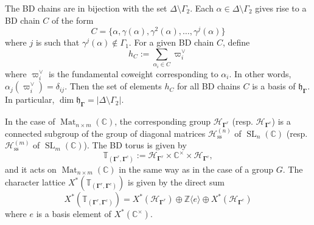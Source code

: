 \documentclass[11pt]{article}
\newcommand{\bg}{\mathbf{\Gamma}}
\DeclareMathOperator{\Mat}{Mat}
\DeclareMathOperator{\SL}{SL}
\DeclareMathOperator{\ses}{ss}
\theoremstyle{definition}\newtheorem{definition}[theorem]{Definition}
\theoremstyle{definition}\newtheorem{remark}[theorem]{Remark}
\theoremstyle{remark}
\numberwithin{equation}{section}
\begin{document}
The BD chains are in bijection with the set $\Delta \setminus \Gamma_2$. Each $\alpha \in \Delta\setminus \Gamma_2$ gives rise to a BD chain $C$ of the form
\begin{equation*}
    C = \{\alpha,\gamma(\alpha),\gamma^2(\alpha),\ldots, \gamma^j(\alpha)\}
\end{equation*}
where $j$ is such that $\gamma^{j}(\alpha) \notin \Gamma_1$. For a given BD chain $C$, define
\begin{equation*}
    h_C := \sum_{\alpha_i \in C} \varpi_i^{\vee}
\end{equation*}
where $\varpi_i^{\vee}$ is the fundamental coweight corresponding to $\alpha_i$. In other words, $\alpha_j(\varpi_i^{\vee}) = \delta_{ij}$. Then the set of elements $h_C$ for all BD chains $C$ is a basis of $\mathfrak{h}_{\bg}$. In particular, $\dim \mathfrak{h}_{\bg} = |\Delta \setminus \Gamma_2|$.

In the case of $\Mat_{n\times m}(\mathbb{C})$, the corresponding group $\mathcal{H}_{\bg^r}$ (resp.  $\mathcal{H}_{\bg^c}$) is a connected subgroup of the group of diagonal matrices $\mathcal{H}_{\ses}^{(n)}$ of $\SL_n(\mathbb{C})$ (resp. $\mathcal{H}_{\ses}^{(m)}$ of $\SL_m(\mathbb{C})$). The BD torus is given by
\begin{equation*}
    \mathbb{T}_{(\bg^r,\bg^c)} := \mathcal{H}_{\bg^r} \times \mathbb{C}^\times \times \mathcal{H}_{\bg^c},
\end{equation*}
and it acts on $\Mat_{n\times m}(\mathbb{C})$ in the same way as in the case of a group $G$. The character lattice $X^*(\mathbb{T}_{(\bg^r,\bg^c)})$ is given by the direct sum
\begin{equation*}
    X^*(\mathbb{T}_{(\bg^r,\bg^c)}) = X^*(\mathcal{H}_{\bg^r}) \oplus \mathbb{Z}\langle e \rangle \oplus X^*(\mathcal{H}_{\bg^c})
\end{equation*}
where $e$ is a basis element of $X^*(\mathbb{C}^\times)$.
\end{document}
